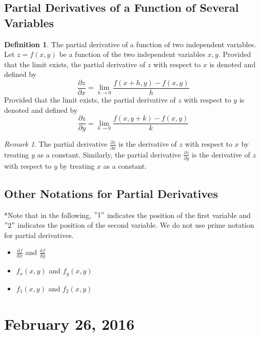 \documentclass[11pt]{article}
\theoremstyle{plain} %
\theoremstyle{definition}
\newtheorem*{definition}{Definition} %
\theoremstyle{example}
\theoremstyle{remark}
\newtheorem*{remark}{Remark}
\begin{document}
\subsection{Partial Derivatives of a Function of Several Variables}


\begin{definition}
The partial derivative of a function of two independent variables. Let $z = f(x,y)$ be a function of the two independent variables $x, y$. Provided that the limit exists, the partial derivative of $z$ with respect to $x$ is denoted and defined by $$\frac{\partial z}{\partial x} = \lim_{h \to 0}\frac{f(x+h,y)-f(x,y)}{h}$$
Provided that the limit exists, the partial derivative of $z$ with respect to $y$ is denoted and defined by $$\frac{\partial z}{\partial y} = \lim_{k \to 0}\frac{f(x, y+k)-f(x,y)}{k}$$

\end{definition}

\begin{remark}
The partial derivative $\frac{\partial z}{\partial x}$ is the derivative of $z$ with respect to $x$ by treating $y$ as a constant. Similarly, the partial derivative $\frac{\partial z}{\partial y}$ is the derivative of $z$ with respect to $y$ by treating $x$ as a constant.
\end{remark}

\subsection{Other Notations for Partial Derivatives}

*Note that in the following, $"1"$ indicates the position of the first variable and $"2"$ indicates the position of the second variable. We do not use prime notation for partial derivatives. 
\begin{itemize}
	\item  $\frac{\mathrm d f}{\mathrm d x}$ and  $\frac{\mathrm d f}{\mathrm d y}$
	\item $f_x(x,y)$ and $f_y(x,y)$
	\item $f_1(x,y)$ and $f_2(x,y)$
\end{itemize}












\section{February 26, 2016}
\end{document}
